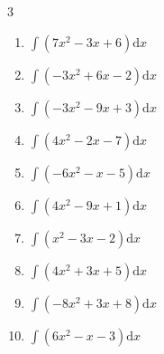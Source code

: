 \begin{multicols}{3}
\begin{enumerate}

\columnbreak %

  \item $\displaystyle \int \left( 7x^{2}-3x+6 \right) \mathrm{d}x$


  \item $\displaystyle \int \left( -3x^{2}+6x-2 \right) \mathrm{d}x$


  \item $\displaystyle \int \left( -3x^{2}-9x+3 \right) \mathrm{d}x$


  \item $\displaystyle \int \left( 4x^{2}-2x-7 \right) \mathrm{d}x$


  \item $\displaystyle \int \left( -6x^{2}-x-5 \right) \mathrm{d}x$


  \item $\displaystyle \int \left( 4x^{2}-9x+1 \right) \mathrm{d}x$


  \item $\displaystyle \int \left( x^{2}-3x-2 \right) \mathrm{d}x$


  \item $\displaystyle \int \left( 4x^{2}+3x+5 \right) \mathrm{d}x$


  \item $\displaystyle \int \left( -8x^{2}+3x+8 \right) \mathrm{d}x$


  \item $\displaystyle \int \left( 6x^{2}-x-3 \right) \mathrm{d}x$


\end{enumerate}
\end{multicols}
